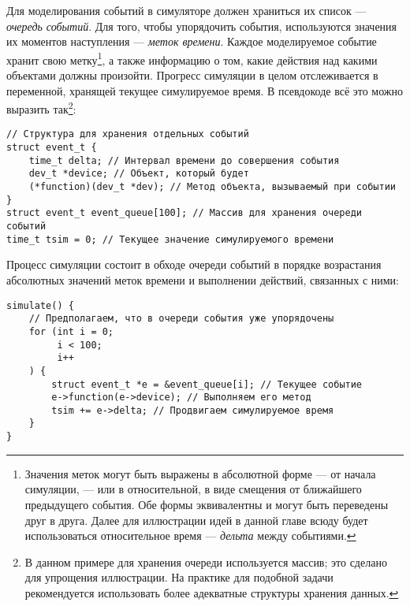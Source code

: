 Для моделирования событий в симуляторе должен храниться их список — \textit{очередь событий}. Для того, чтобы упорядочить события, используются значения их моментов наступления — \textit{меток времени}. Каждое моделируемое событие хранит свою метку\footnote{Значения меток могут быть выражены в абсолютной форме — от начала симуляции, — или в относительной, в виде смещения от ближайшего предыдущего события. Обе формы эквивалентны и могут быть переведены друг в друга. Далее для иллюстрации идей в данной главе всюду будет использоваться относительное время — \textit{дельта} между событиями.}, а также информацию о том, какие действия над какими объектами должны произойти. Прогресс симуляции в целом отслеживается в переменной, хранящей текущее симулируемое время. В псевдокоде всё это можно выразить так\footnote{В данном примере для хранения очереди используется массив; это сделано для упрощения иллюстрации. На практике для подобной задачи рекомендуется использовать более адекватные структуры хранения данных.
}:

\begin{lstlisting}
// Структура для хранения отдельных событий
struct event_t { 
    time_t delta; // Интервал времени до совершения события
    dev_t *device; // Объект, который будет
    (*function)(dev_t *dev); // Метод объекта, вызываемый при событии
}
struct event_t event_queue[100]; // Массив для хранения очереди событий
time_t tsim = 0; // Текущее значение симулируемого времени
\end{lstlisting}

Процесс симуляции состоит в обходе очереди событий в порядке возрастания абсолютных значений меток времени и выполнении действий, связанных с ними:

\begin{lstlisting}
simulate() {
    // Предполагаем, что в очереди события уже упорядочены
    for (int i = 0;
         i < 100;
         i++
    ) {
        struct event_t *e = &event_queue[i]; // Текущее событие
        e->function(e->device); // Выполняем его метод
        tsim += e->delta; // Продвигаем симулируемое время
    }
}
\end{lstlisting}

